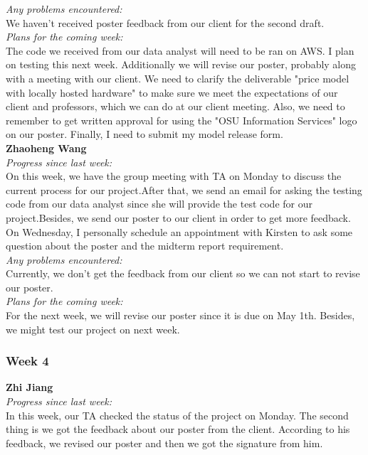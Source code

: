 \noindent\textit{Any problems encountered:}\\
We haven't received poster feedback from our client for the second draft.\\

\noindent\textit{Plans for the coming week:}\\
The code we received from our data analyst will need to be ran on AWS. I plan on testing this next week. Additionally we will revise our poster, probably along with a meeting with our client. We need to clarify the deliverable "price model with locally hosted hardware" to make sure we meet the expectations of our client and professors, which we can do at our client meeting. Also, we need to remember to get written approval for using the "OSU Information Services" logo on our poster. Finally, I need to submit my model release form.\\

\noindent\textbf{Zhaoheng Wang}\\
\noindent\textit{Progress since last week:}\\
On this week, we have the group meeting with TA on Monday to discuss the current process for our project.After that, we send an email for asking the testing code from our data analyst since she will provide the test code for our project.Besides, we send our poster to our client in order to get more feedback. On Wednesday, I personally schedule an appointment with Kirsten to ask some question about the poster and the midterm report requirement.\\

\noindent\textit{Any problems encountered:}\\
Currently, we don't get the feedback from our client so we can not start to revise our poster.\\

\noindent\textit{Plans for the coming week:}\\
For the next week, we will revise our poster since it is due on May 1th. Besides, we might test our project on next week.

\subsubsection{Week 4}
\textbf{Zhi Jiang}\\
\noindent\textit{Progress since last week:}\\
In this week, our TA checked the status of the project on Monday. The second thing is we got the feedback about our poster from the client. According to his feedback, we revised our poster and then we got the signature from him.

